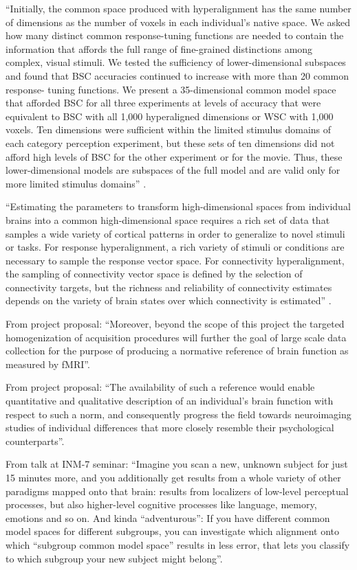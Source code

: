 ``Initially, the common space produced with hyperalignment has the same number
of dimensions as the number of voxels in each individual’s native space. We
asked how many distinct common response-tuning functions are needed to contain
the information that affords the full range of fine-grained distinctions among
complex, visual stimuli. We tested the sufficiency of lower-dimensional
subspaces and found that BSC accuracies continued to increase with more than 20
common response- tuning functions. We present a 35-dimensional common model
space that afforded BSC for all three experiments at levels of accuracy that
were equivalent to BSC with all 1,000 hyperaligned dimensions or WSC with 1,000
voxels. Ten dimensions were sufficient within the limited stimulus domains of
each category perception experiment, but these sets of ten dimensions did not
afford high levels of BSC for the other experiment or for the movie. Thus, these
lower-dimensional models are subspaces of the full model and are valid only for
more limited stimulus domains'' \citep{haxby2011common}.


``Estimating the parameters to transform high-dimensional spaces from individual
brains into a common high-dimensional space requires a rich set of data that
samples a wide variety of cortical patterns in order to generalize to novel
stimuli or tasks. For response hyperalignment, a rich variety of stimuli or
conditions are necessary to sample the response vector space. For connectivity
hyperalignment, the sampling of connectivity vector space is defined by the
selection of connectivity targets, but the richness and reliability of
connectivity estimates depends on the variety of brain states over which
connectivity is estimated'' \citep{haxby2020hyperalignment}.

%
From project proposal: ``Moreover, beyond the scope of this project the targeted
homogenization of acquisition procedures will further the goal of large scale
data collection for the purpose of producing a normative reference of brain
function as measured by fMRI''.

%
From project proposal: ``The availability of such a reference would enable
quantitative and qualitative description of an individual's brain function with
respect to such a norm, and consequently progress the field towards neuroimaging
studies of individual differences that more closely resemble their psychological
counterparts''.

%
From talk at INM-7 seminar: ``Imagine you scan a new, unknown subject for just
15 minutes more, and you additionally get results from a whole variety of other
paradigms mapped onto that brain: results from localizers of low-level
perceptual processes, but also higher-level cognitive processes like language,
memory, emotions and so on. And kinda ``adventurous'': If you have different
common model spaces for different subgroups, you can investigate which alignment
onto which ``subgroup common model space'' results in less error, that lets you
classify to which subgroup your new subject might belong''.

